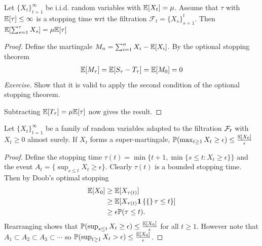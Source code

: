 \begin{theorem}
    Let $\{X_t\}_{t=1}^{\infty}$ be i.i.d. random variables with $\mathbb{E}[X_t] = \mu$. Assume that $\tau$ with $\mathbb{E}[\tau]\leq \infty$ is a stopping time wrt the filtration $\mathcal{F}_{t} = \{X_s\}_{s=1}^t$. Then $\mathbb{E}[\sum_{s=1}^{\tau} X_s] = \mu\mathbb{E}[\tau]$
\end{theorem}
\begin{proof}
    Define the martingale $M_n = \sum_{i=1}^n X_i - \mathbb{E}[X_i]$. By the optional stopping theorem
    \begin{align*}
        \mathbb{E}[M_{\tau}] = \mathbb{E}[S_{\tau} - T_{\tau}] = \mathbb{E}[M_0] = 0
    \end{align*}
    \textit{Exercise.} Show that it is valid to apply the second condition of the optional stopping theorem. 
    
    Subtracting $\mathbb{E}[T_{\tau}] = \mu\mathbb{E}[\tau]$ now gives the result. 
\end{proof}


\begin{theorem}
    Let $\{X_t\}_{t=1}^{\infty}$ be a family of random variables adapted to the filtration $\mathcal{F}_t$ with $X_t\geq 0$ almost surely.  If $X_t$ forms a super-martingale, $\mathbb{P}(\max_{t\geq 1} X_t \geq \epsilon) \leq \frac{\mathbb{E}[X_0]}{\epsilon}$
\end{theorem}
\begin{proof}
    Define the stopping time $\tau(t) = \min\{t+1,\min\{s\leq t: X_t\geq \epsilon\}\}$ and the event $A_t = \{\sup_{s\leq t} X_t \geq \epsilon\}$. Clearly $\tau(t)$ is a bounded stopping time. Then by Doob's optimal stopping
    \begin{align*}
        \mathbb{E}[X_0] 
        &\geq \mathbb{E}[X_{\tau(t)}] \\
        &\geq \mathbb{E}[X_{\tau(t)} \mathbf{1}\left\{\{\right\}\tau \leq t\}] \\
        &\geq \epsilon \mathbb{P}(\tau \leq t).
    \end{align*}
    Rearranging shows that $\mathbb{P}(\sup_{s\leq t} X_t \geq \epsilon) \leq \frac{\mathbb{E}[X_0]}{\epsilon}$ for all $t\geq 1$. However note that $A_1\subset A_2\subset A_3\subset \cdots$ so $\mathbb{P}(\sup_{t\geq 1} X_{t} > \epsilon) \leq \frac{\mathbb{E}[X_0]}{\epsilon}$.
\end{proof}


